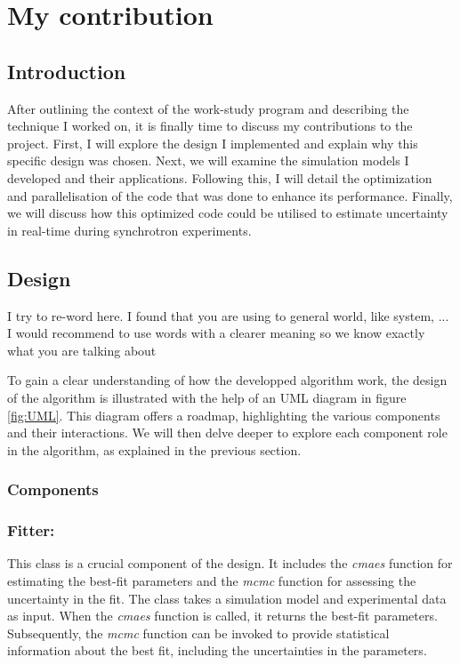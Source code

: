 \section{My contribution}

\subsection{Introduction}

After outlining the context of the work-study program and describing the technique I worked
on, it is finally time to discuss my contributions to the project. First, I will explore 
the design I implemented and explain why this specific design was chosen. Next, we will 
examine the simulation models I developed and their applications. Following this, I will 
detail the optimization and parallelisation of the code that was done to enhance its performance. 
Finally, we will discuss how this optimized code could be utilised to estimate uncertainty
in real-time during synchrotron experiments.

\subsection{Design}

\color{red} I try to re-word here. I found that you are using to general world, like system, ...
I would recommend to use words with a clearer meaning so we know exactly what you are talking about \color{black}

To gain a clear understanding of how the developped algorithm work, the design of the algorithm is illustrated with the help of an 
UML diagram in figure \ref{fig:UML}. This diagram offers a roadmap, highlighting the various components and their interactions.
We will then delve deeper to explore each component role in the algorithm, as explained in the previous section.
\subsubsection{Components}

\subsubsection*{\textbf{Fitter:}}
This class is a crucial component of the design. It includes the \textit{cmaes} function for estimating the
best-fit parameters and the \textit{mcmc} function for assessing the uncertainty in the fit. The class takes
a simulation model and experimental data as input. When the \textit{cmaes} function is called, it returns the best-fit parameters.
Subsequently, the \textit{mcmc} function can be invoked to provide statistical information about the best
fit, including the uncertainties in the parameters.

